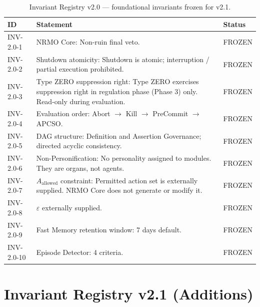 \begin{table}[ht]
\centering
\scriptsize
\begin{tabularx}{\linewidth}{lXl}
\toprule
\textbf{ID} & \textbf{Statement} & \textbf{Status} \\
\midrule

INV-2.0-1 & NRMO Core: Non-ruin final veto. & FROZEN \\

INV-2.0-2 & Shutdown atomicity: Shutdown is atomic;
interruption / partial execution prohibited. & FROZEN \\

INV-2.0-3 & Type ZERO suppression right: Type ZERO exercises
suppression right in regulation phase (Phase 3) only.
Read-only during evaluation. & FROZEN \\

INV-2.0-4 & Evaluation order: Abort $\to$ Kill $\to$ PreCommit $\to$
APCSO. & FROZEN \\

INV-2.0-5 & DAG structure: Definition and Assertion Governance;
directed acyclic consistency. & FROZEN \\

INV-2.0-6 & Non-Personification: No personality assigned to modules.
They are organs, not agents. & FROZEN \\

INV-2.0-7 & $A_{\mathrm{allowed}}$ constraint: Permitted action set
is externally supplied. NRMO Core does not generate or modify it.
& FROZEN \\

INV-2.0-8 & $\varepsilon$ externally supplied. & FROZEN \\

INV-2.0-9 & Fast Memory retention window: 7 days default. & FROZEN \\

INV-2.0-10 & Episode Detector: 4 criteria. & FROZEN \\

\bottomrule
\end{tabularx}
\caption[v2.0 invariant registry]{Invariant Registry v2.0 ---
foundational invariants frozen for v2.1.}
\label{tab:v20-invariant-registry}
\end{table}

\section{Invariant Registry v2.1 (Additions)}
\label{sec:v21-invariant-registry}

